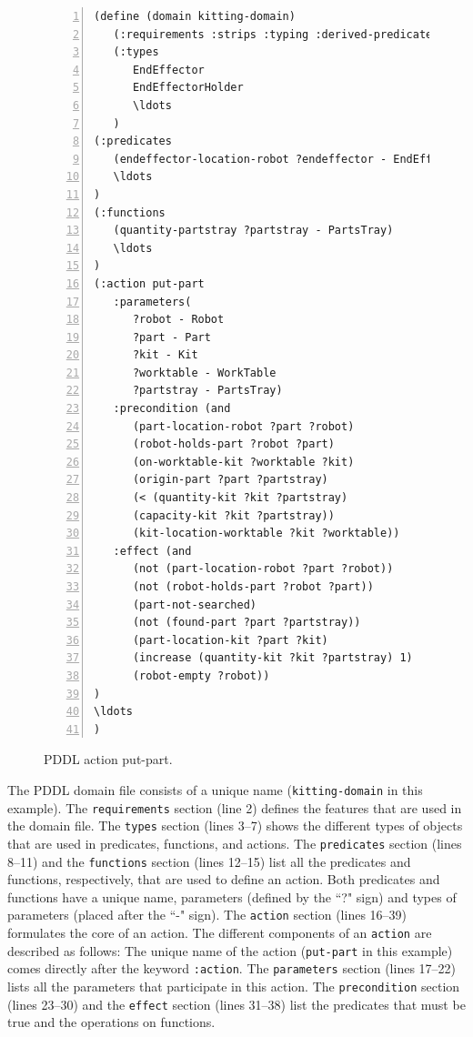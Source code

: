 \begin{figure}[t!h!]
\centering
\begin{minipage}{.5\paperwidth}
\begin{list}{}{\setlength{\leftmargin}{1em}}\item\small
\begin{Verbatim}[commandchars=\\\{\},fontsize=\scriptsize, numbers=left, numbersep=2pt]
(define (domain kitting-domain)
   (:requirements :strips :typing :derived-predicates :action-costs :fluents)
   (:types
      EndEffector
      EndEffectorHolder
      \ldots
   )
(:predicates
   (endeffector-location-robot ?endeffector - EndEffector ?robot - Robot)	
   \ldots
)
(:functions
   (quantity-partstray ?partstray - PartsTray)
   \ldots
)
(:action put-part
   :parameters(
      ?robot - Robot
      ?part - Part
      ?kit - Kit
      ?worktable - WorkTable
      ?partstray - PartsTray)
   :precondition (and
      (part-location-robot ?part ?robot)
      (robot-holds-part ?robot ?part)
      (on-worktable-kit ?worktable ?kit)
      (origin-part ?part ?partstray)
      (< (quantity-kit ?kit ?partstray)
      (capacity-kit ?kit ?partstray))
      (kit-location-worktable ?kit ?worktable))
   :effect (and
      (not (part-location-robot ?part ?robot))
      (not (robot-holds-part ?robot ?part))
      (part-not-searched)
      (not (found-part ?part ?partstray))
      (part-location-kit ?part ?kit)
      (increase (quantity-kit ?kit ?partstray) 1)
      (robot-empty ?robot))
)
\ldots
)
\end{Verbatim}
\end{list}
\end{minipage}
\caption{PDDL action put-part.}
\label{fig:put-part}
\end{figure}
The PDDL domain file consists of a unique name (\texttt{kitting-domain}
in this example). The \texttt{requirements} section (line 2)
defines the features that are used in the domain file. The \texttt{types}
section (lines 3--7) shows the different types of objects that are used
in predicates, functions, and actions. The \texttt{predicates} section
(lines 8--11) and the \texttt{functions} section (lines 12--15) list all
the predicates and functions, respectively, that are used to define an action.
Both predicates and functions have a unique name, parameters (defined by the
``?" sign) and types of parameters (placed after the ``-" sign). The \texttt{action}
section (lines 16--39) formulates the core of an action. The different components
of an \texttt{action} are described as follows: The unique name of the action
(\texttt{put-part} in this example) comes directly after the keyword \texttt{:action}.
The \texttt{parameters} section (lines 17--22) lists all the parameters that
participate in this action. The \texttt{precondition} section (lines 23--30)
and the \texttt{effect} section (lines 31--38) list the predicates that must
be true and the operations on functions.

